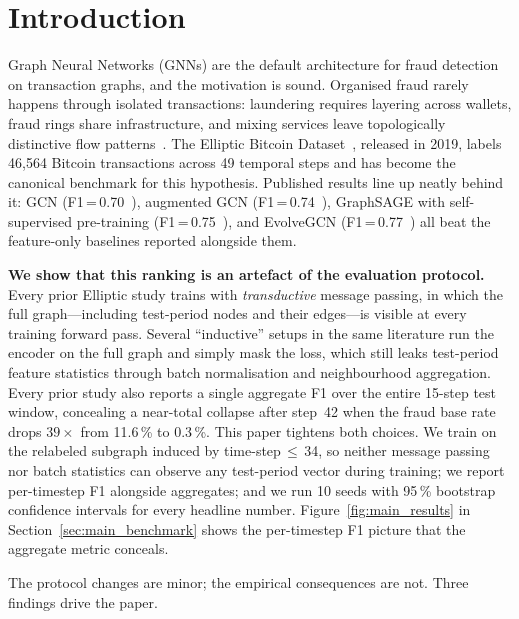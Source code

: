 
\section{Introduction}
\label{sec:intro}

Graph Neural Networks (GNNs) are the default architecture for fraud
detection on transaction graphs, and the motivation is sound.
Organised fraud rarely happens through isolated transactions:
laundering requires layering across wallets, fraud rings share
infrastructure, and mixing services leave topologically distinctive
flow patterns~\citep{akoglu2015graph}.  The Elliptic Bitcoin
Dataset~\citep{weber2019}, released in 2019, labels 46{,}564 Bitcoin
transactions across 49 temporal steps and has become the canonical
benchmark for this hypothesis.  Published results line up neatly
behind it: GCN (F1\,=\,0.70~\citep{weber2019}), augmented GCN
(F1\,=\,0.74~\citep{alarab2020}), GraphSAGE with self-supervised
pre-training (F1\,=\,0.75~\citep{lo2023}), and EvolveGCN
(F1\,=\,0.77~\citep{pareja2020evolvegcn}) all beat the feature-only
baselines reported alongside them.

\textbf{We show that this ranking is an artefact of the evaluation
protocol.}  Every prior Elliptic study trains with \emph{transductive}
message passing, in which the full graph---including test-period
nodes and their edges---is visible at every training forward pass.
Several ``inductive'' setups in the same literature run the encoder on
the full graph and simply mask the loss, which still leaks
test-period feature statistics through batch normalisation and
neighbourhood aggregation.  Every prior study also reports a single
aggregate F1 over the entire 15-step test window, concealing a
near-total collapse after step~42 when the fraud base rate drops
$39\times$ from 11.6\,\% to 0.3\,\%.  This paper tightens both
choices.  We train on the relabeled subgraph induced by
time-step\,$\le$\,34, so neither message passing nor batch statistics
can observe any test-period vector during training; we report
per-timestep F1 alongside aggregates; and we run 10 seeds with
95\,\% bootstrap confidence intervals for every headline number.
Figure~\ref{fig:main_results} in Section~\ref{sec:main_benchmark}
shows the per-timestep F1 picture that the aggregate metric conceals.

The protocol changes are minor; the empirical consequences are not.
Three findings drive the paper.

